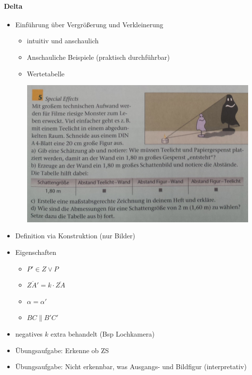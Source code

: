 \documentclass[11pt]{article}
\begin{document}
\paragraph{Delta}
\begin{itemize}
	\item Einführung über Vergrößerung und Verkleinerung
	\begin{itemize}
		\item intuitiv und anschaulich
		\item Anschauliche Beispiele (praktisch durchführbar)
		\item Wertetabelle
		\begin{center}
			\includegraphics[width=0.7\linewidth]{ZS_Bsp}
		\end{center}
	\end{itemize}
	\item Definition via Konstruktion (nur Bilder)
	\item Eigenschaften
	\begin{itemize}
		\item $ P' \in Z \lor P $
		\item $ \overline{ZA'} = k \cdot \overline{ZA} $
		\item $ \alpha = \alpha' $
		\item $ BC \parallel B'C' $
	\end{itemize}
	\item negatives $ k $ extra behandelt (Bsp Lochkamera)
	\item Übungsaufgabe: Erkenne ob ZS
	\item Übungsaufgabe: Nicht erkennbar, was Ausgangs- und Bildfigur (interpretativ)
\end{itemize}
\end{document}
